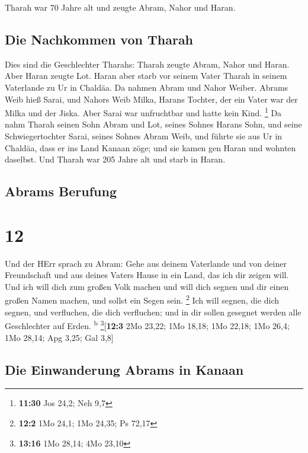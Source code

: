  Tharah war 70 Jahre alt und zeugte Abram, Nahor und
Haran.

\hypertarget{die-nachkommen-von-tharah}{%
\subsection{Die Nachkommen von Tharah}\label{die-nachkommen-von-tharah}}

 Dies sind die Geschlechter Tharahs: Tharah zeugte Abram,
Nahor und Haran. Aber Haran zeugte Lot.  Haran aber starb
vor seinem Vater Tharah in seinem Vaterlande zu Ur in Chaldäa.
 Da nahmen Abram und Nahor Weiber. Abrams Weib hieß
Sarai, und Nahors Weib Milka, Harans Tochter, der ein Vater war der
Milka und der Jiska.  Aber Sarai war unfruchtbar und
hatte kein Kind. \footnote{\textbf{11:30} Jos 24,2; Neh 9,7}
 Da nahm Tharah seinen Sohn Abram und Lot, seines Sohnes
Harans Sohn, und seine Schwiegertochter Sarai, seines Sohnes Abram Weib,
und führte sie aus Ur in Chaldäa, dass er ins Land Kanaan zöge; und sie
kamen gen Haran und wohnten daselbst.  Und Tharah war 205
Jahre alt und starb in Haran.

\hypertarget{abrams-berufung}{%
\subsection{Abrams Berufung}\label{abrams-berufung}}

\hypertarget{section-11}{%
\section{12}\label{section-11}}

 Und der HErr sprach zu Abram: Gehe aus deinem Vaterlande
und von deiner Freundschaft und aus deines Vaters Hause in ein Land, das
ich dir zeigen will.  Und ich will dich zum großen Volk
machen und will dich segnen und dir einen großen Namen machen, und
sollst ein Segen sein. \footnote{\textbf{12:2} 1Mo 24,1; 1Mo 24,35; Ps
  72,17}  Ich will segnen, die dich segnen, und
verfluchen, die dich verfluchen; und in dir sollen gesegnet werden alle
Geschlechter auf Erden. \textsuperscript{b} \footnote{\textbf{13:16} 1Mo
  28,14; 4Mo 23,10}{[}\textbf{12:3} 2Mo 23,22; 1Mo 18,18; 1Mo 22,18; 1Mo
26,4; 1Mo 28,14; Apg 3,25; Gal 3,8{]}

\hypertarget{die-einwanderung-abrams-in-kanaan}{%
\subsection{Die Einwanderung Abrams in
Kanaan}\label{die-einwanderung-abrams-in-kanaan}}

